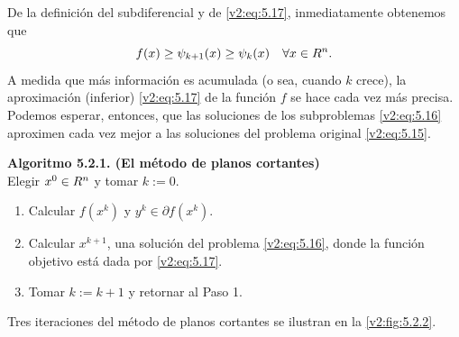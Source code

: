 De la definición del subdiferencial y de \eqref{v2:eq:5.17}, inmediatamente obtenemos que
\begin{equation}
    f(x) \ge \psi_{k+1}(x) \ge \psi_k(x) \quad \forall x \in R^n.
    \label{v2:eq:5.20}
\end{equation}
A medida que más información es acumulada (o sea, cuando $k$ crece), la aproximación (inferior) \eqref{v2:eq:5.17} de la función $f$ se hace cada vez más precisa. Podemos esperar, entonces, que las soluciones de los subproblemas \eqref{v2:eq:5.16} aproximen cada vez mejor a las soluciones del problema original \eqref{v2:eq:5.15}.

\vspace{0.3cm}
\noindent \textbf{Algoritmo 5.2.1. (El método de planos cortantes)} \\
Elegir $x^0 \in R^n$ y tomar $k := 0$.
\begin{enumerate}[label=\arabic*., itemsep=0.1cm, topsep=0.1cm]
    \item Calcular $f(x^k)$ y $y^k \in \partial f(x^k)$.
    \item Calcular $x^{k+1}$, una solución del problema \eqref{v2:eq:5.16}, donde la función objetivo está dada por \eqref{v2:eq:5.17}.
    \item Tomar $k := k + 1$ y retornar al Paso 1.
\end{enumerate}
\vspace{0.3cm}

Tres iteraciones del método de planos cortantes se ilustran en la \cref{v2:fig:5.2.2}.

